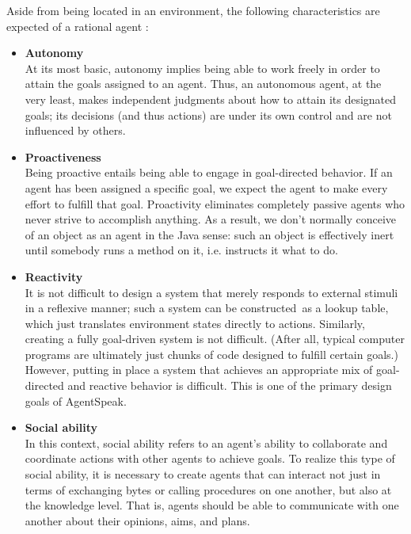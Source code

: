 \vspace{.5cm}

Aside from being located in an environment, the following characteristics are expected of a rational agent \cite{charAgent}:

\vspace{.5cm}

\begin{itemize}
    \item \textbf{Autonomy}\\
    At its most basic, autonomy implies being able to work freely in order to attain the goals assigned to an agent. Thus, an autonomous agent, at the very least, makes independent judgments about how to attain its designated goals; its decisions (and thus actions) are under its own control and are not influenced by others.

    \vspace{.5cm}
    
    \item \textbf{Proactiveness}\\
    Being proactive entails being able to engage in goal-directed behavior. If an agent has been assigned a specific goal, we expect the agent to make every effort to fulfill that goal. Proactivity eliminates completely passive agents who never strive to accomplish anything. As a result, we don't normally conceive of an object as an agent in the Java sense: such an object is effectively inert until somebody runs a method on it, i.e. instructs it what to do.

    \vspace{.5cm}
    
    \item \textbf{Reactivity}\\
    It is not difficult to design a system that merely responds to external stimuli in a reflexive manner; such a system can be constructed as a lookup table, which just translates environment states directly to actions. Similarly, creating a fully goal-driven system is not difficult. (After all, typical computer programs are ultimately just chunks of code designed to fulfill certain goals.) However, putting in place a system that achieves an appropriate mix of goal-directed and reactive behavior is difficult. This is one of the primary design goals of AgentSpeak.

    \vspace{.5cm}
    
    \item \textbf{Social ability}\\
    In this context, social ability refers to an agent's ability to collaborate and coordinate actions with other agents to achieve goals. To realize this type of social ability, it is necessary to create agents that can interact not just in terms of exchanging bytes or calling procedures on one another, but also at the knowledge level. That is, agents should be able to communicate with one another about their opinions, aims, and plans.
    
    \vspace{.5cm}
    
\end{itemize}

